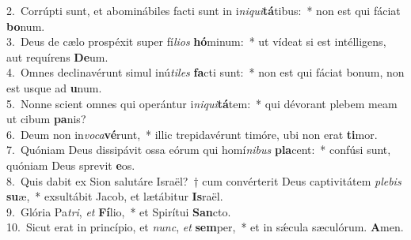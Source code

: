 {2.~}Corrúpti sunt, et abominábiles facti sunt in i\textit{ni}\textit{qui}\textbf{tá}tibus:~* non est qui fáciat \textbf{bo}num.\\
{3.~}Deus de cælo prospéxit super fí\textit{li}\textit{os} \textbf{hó}minum:~* ut vídeat si est intélligens, aut requírens \textbf{De}um.\\
{4.~}Omnes declinavérunt simul inú\textit{ti}\textit{les} \textbf{fa}cti sunt:~* non est qui fáciat bonum, non est usque ad \textbf{u}num.\\
{5.~}Nonne scient omnes qui operántur i\textit{ni}\textit{qui}\textbf{tá}tem:~* qui dévorant plebem meam ut cibum \textbf{pa}nis?\\
{6.~}Deum non in\textit{vo}\textit{ca}\textbf{vé}runt,~* illic trepidavérunt timóre, ubi non erat \textbf{ti}mor.\\
{7.~}Quóniam Deus dissipávit ossa eórum qui homí\textit{ni}\textit{bus} \textbf{pla}cent:~* confúsi sunt, quóniam Deus sprevit \textbf{e}os.\\
{8.~}Quis dabit ex Sion salutáre Israël?~† cum convérterit Deus captivitátem \textit{ple}\textit{bis} \textbf{su}æ,~* exsultábit Jacob, et lætábitur \textbf{Is}raël.\\
{9.~}Glória Pa\textit{tri}, \textit{et} \textbf{Fí}lio,~* et Spirítui \textbf{San}cto.\\
{10.~}Sicut erat in princípio, et \textit{nunc}, \textit{et} \textbf{sem}per,~* et in sǽcula sæculórum. \textbf{A}men.\\
